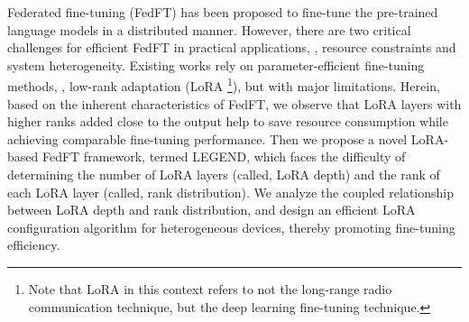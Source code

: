 Federated fine-tuning (FedFT) has been proposed to fine-tune the pre-trained language models in a distributed manner.
However, there are two critical challenges for efficient FedFT in practical applications, \ie, resource constraints and system heterogeneity.
Existing works rely on parameter-efficient fine-tuning methods, \eg, low-rank adaptation (LoRA \footnote{Note that LoRA in this context refers to not the long-range radio communication technique, but the deep learning fine-tuning technique.}), but with major limitations.
Herein, based on the inherent characteristics of FedFT, we observe that LoRA layers with higher ranks added close to the output help to save resource consumption while achieving comparable fine-tuning performance.
Then we propose a novel LoRA-based FedFT framework, termed LEGEND, which faces the difficulty of determining the number of LoRA layers (called, LoRA depth) and the rank
of each LoRA layer (called, rank distribution). 
We analyze the coupled relationship between LoRA depth and rank distribution, and design an efficient LoRA configuration algorithm for heterogeneous devices, thereby promoting fine-tuning efficiency. 
